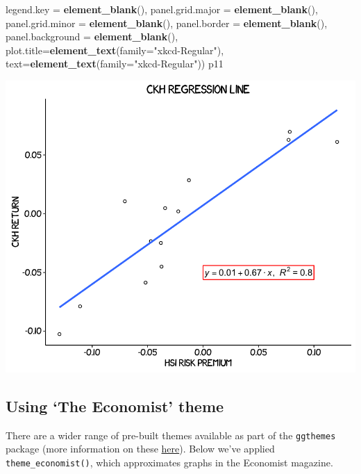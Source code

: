 \documentclass[]{article}
\newenvironment{Shaded}{\begin{snugshade}}{\end{snugshade}}
\newcommand{\KeywordTok}[1]{\textcolor[rgb]{0.13,0.29,0.53}{\textbf{{#1}}}}
\newcommand{\DataTypeTok}[1]{\textcolor[rgb]{0.13,0.29,0.53}{{#1}}}
\newcommand{\StringTok}[1]{\textcolor[rgb]{0.31,0.60,0.02}{{#1}}}
\newcommand{\NormalTok}[1]{{#1}}
\begin{document}
\begin{Shaded}
\begin{Highlighting}[]
    \DataTypeTok{legend.key =} \KeywordTok{element_blank}\NormalTok{(),}
    \DataTypeTok{panel.grid.major =} \KeywordTok{element_blank}\NormalTok{(),}
    \DataTypeTok{panel.grid.minor =} \KeywordTok{element_blank}\NormalTok{(), }
    \DataTypeTok{panel.border =} \KeywordTok{element_blank}\NormalTok{(),}
    \DataTypeTok{panel.background =} \KeywordTok{element_blank}\NormalTok{(),}
    \DataTypeTok{plot.title=}\KeywordTok{element_text}\NormalTok{(}\DataTypeTok{family=}\StringTok{"xkcd-Regular"}\NormalTok{), }
    \DataTypeTok{text=}\KeywordTok{element_text}\NormalTok{(}\DataTypeTok{family=}\StringTok{"xkcd-Regular"}\NormalTok{)) }
\NormalTok{p11}
\end{Highlighting}
\end{Shaded}

\begin{center}\includegraphics{11_Linear_Regression_Plot_pdf/lr_15-1} \end{center}

\subsection{\texorpdfstring{Using `The Economist'
theme}{Using The Economist theme}}\label{using-the-economist-theme}

There are a wider range of pre-built themes available as part of the
\texttt{ggthemes} package (more information on these
\href{https://cran.r-project.org/web/packages/ggthemes/vignettes/ggthemes.html}{here}).
Below we've applied \texttt{theme\_economist()}, which approximates
graphs in the Economist magazine.
\end{document}
